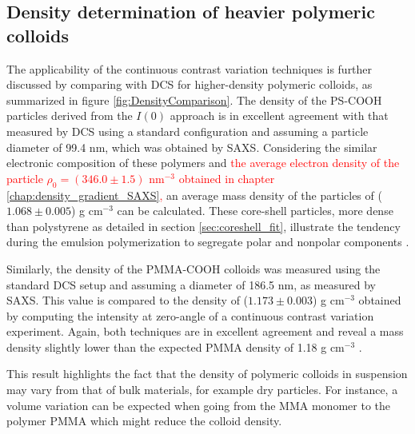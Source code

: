 \subsection{Density determination of heavier polymeric colloids}
The applicability of the continuous contrast variation techniques is further discussed by comparing with DCS for higher-density polymeric colloids, as summarized in figure \ref{fig:DensityComparison}. The density of the PS-COOH particles derived from the $I(0)$ approach is in excellent agreement with that measured by DCS using a standard configuration and assuming a particle diameter of 99.4 nm, which was obtained by SAXS. Considering the similar electronic composition of these polymers and \textcolor{red}{the average electron density of the particle $\rho_0=\left( 346.0\pm1.5\right)$ nm\(^{-3}\) obtained in chapter \ref{chap:density_gradient_SAXS},} an average mass density of the particles of ($1.068\pm0.005$) g cm$^{-3}$ can be calculated. These core-shell particles, more dense than polystyrene as detailed in section \ref{sec:coreshell_fit}, illustrate the tendency during the emulsion polymerization to segregate polar and nonpolar components \citep{dingenouts_structure_1994}.

Similarly, the density of the PMMA-COOH colloids was measured using the standard DCS setup and assuming a diameter of 186.5 nm, as measured by SAXS. This value is compared to the density of ($1.173\pm0.003$) g cm$^{-3}$ obtained by computing the intensity at zero-angle of a continuous contrast variation experiment. Again, both techniques are in excellent agreement and reveal a mass density slightly lower than the expected PMMA density of 1.18 g cm$^{-3}$ \citep{dingenouts_analysis_1999}.

This result highlights the fact that the density of polymeric colloids in suspension may vary from that of bulk materials, for example dry particles. For instance, a volume variation can be expected when going from the MMA monomer to the polymer PMMA \citep{nichols_prediction_1950} which might reduce the colloid density.
